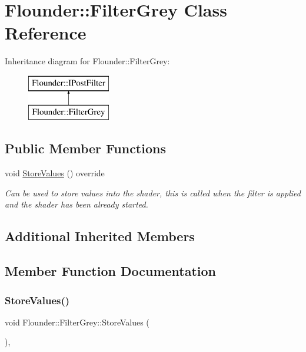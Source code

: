 \hypertarget{class_flounder_1_1_filter_grey}{}\section{Flounder\+:\+:Filter\+Grey Class Reference}
\label{class_flounder_1_1_filter_grey}
Inheritance diagram for Flounder\+:\+:Filter\+Grey\+:\begin{figure}[H]
\begin{center}
\leavevmode
\includegraphics[height=2.000000cm]{class_flounder_1_1_filter_grey}
\end{center}
\end{figure}
\subsection*{Public Member Functions}
\begin{DoxyCompactItemize}
\item 
void \hyperlink{class_flounder_1_1_filter_grey_a4ba89cfb0b79ffd5bc94248234613520}{Store\+Values} () override
\begin{DoxyCompactList}\small\item\em Can be used to store values into the shader, this is called when the filter is applied and the shader has been already started. \end{DoxyCompactList}\end{DoxyCompactItemize}
\subsection*{Additional Inherited Members}


\subsection{Member Function Documentation}
\mbox{\label{class_flounder_1_1_filter_grey_a4ba89cfb0b79ffd5bc94248234613520}} 
\subsubsection{\texorpdfstring{Store\+Values()}{StoreValues()}}
{\footnotesize\ttfamily void Flounder\+::\+Filter\+Grey\+::\+Store\+Values (\begin{DoxyParamCaption}{ }\end{DoxyParamCaption})\hspace{0.3cm}{\ttfamily [override]}, {\ttfamily [virtual]}}



